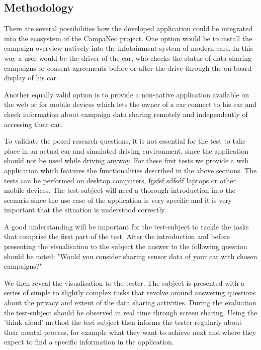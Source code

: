

  \subsection{Methodology}
  There are several possibilities how the developed
  application could be integrated into the ecosystem of the CampaNeo project.
  One option would be to install the campaign overview natively into the
  infotainment system of modern cars.  In this way a user would be the driver
  of the car, who checks the status of data sharing campaigns or consent
  agreements before or after the drive through the on-board display of his car.

  Another equally valid option is to provide a non-native application available
  on the web or for mobile devices which lets the owner of a car connect to his
  car and check information about campaign data sharing remotely and
  independently of accessing their car.

  To validate the posed research questions, it is not essential for the test to
  take place in an actual car and simulated driving environment, since the
  application should not be used while driving anyway. For these first tests we
  provide a web application which features the functionalities described in the
  above sections. The tests can be performed on desktop computers, fgsfsf
  sdfsdf laptops or other mobile devices.  The test-subject will need a
  thorough introduction into the scenario since the use case of the application
  is very specific and it is very important that the situation is understood
  correctly.

  A good understanding will be important for the test-subject to tackle the
  tasks that comprise the first part of the test.  After the introduction and
  before presenting the visualisation to the subject the answer to the
  following question should be noted: "Would you consider sharing sensor data
  of your car with chosen campaigns?"

  We then reveal the visualisation to the tester. The subject is presented with
  a series of simple to slightly complex tasks that revolve around answering
  questions about the privacy and extent of the data sharing activities.
  During the evaluation the test-subject should be observed in real time
  through screen sharing.  Using the 'think aloud' method the test subject then
  informs the tester regularly about their mental process, for example what
  they want to achieve next and where they expect to find a specific
  information in the application.

